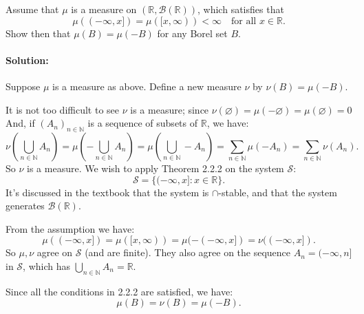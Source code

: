 \documentclass{article}
\begin{document}
\begin{exe}
    Assume that $\mu$ is a measure on $(\mathbb{R},\mathcal{B}(\mathbb{R}))$, which satisfies that 
    \[
        \mu((-\infty,x])=\mu([x,\infty))<\infty\quad \text{for all }x\in \mathbb{R}
    .\] 
    Show then that $\mu(B)=\mu(-B)$ for any Borel set $B$.
\end{exe}
\paragraph{Solution: }Suppose $\mu$ is a measure as above. Define a new measure $\nu$ by $\nu(B)=\mu(-B)$.

It is not too difficult to see $\nu$ is a measure; since $\nu(\varnothing)=\mu(-\varnothing)=\mu(\varnothing)=0$
And, if $(A_n)_{n\in \mathbb{N}}$ is a sequence of subsets of $\mathbb{R}$, we have:
\[
\nu\left( \bigcup_{n\in \mathbb{N}} A_n \right) =\mu\left( -\bigcup_{n\in \mathbb{N}} A_n \right) = \mu\left( \bigcup_{n\in \mathbb{N}} -A_n \right) =\sum_{n\in \mathbb{N}}^{} \mu(-A_n)=\sum_{n\in \mathbb{N}}^{} \nu(A_n)
.\] 
So $\nu$ is a measure.
We wish to apply Theorem 2.2.2 on the system $\mathcal{S}$:
\[
    \mathcal{S}=\{(-\infty,x]:x\in \mathbb{R}\}
.\] 
It's discussed in the textbook that the system is $\cap $-stable, and that the system generates $\mathcal{B}(\mathbb{R})$.

From the assumption we have:
\[
    \mu((-\infty,x])=\mu([x,\infty))=\mu(-(-\infty,x])=\nu((-\infty,x])
.\] 
So $\mu,\nu$ agree on $\mathcal{S}$ (and are finite). They also agree on the sequence $A_n=(-\infty,n]$ in $\mathcal{S}$, which has $\bigcup_{n\in \mathbb{N}} A_n=\mathbb{R}$.

Since all the conditions in 2.2.2 are satisfied, we have:
\[
    \mu(B)=\nu(B)=\mu(-B)
.\] 
\end{document}
